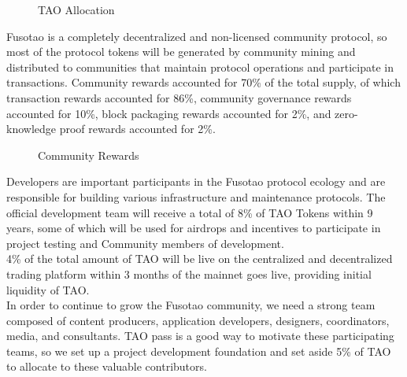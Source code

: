 \documentclass[a4paper,12pt]{article}
\begin{document}
\begin{figure}[htb]        
 \caption{\label{1} TAO Allocation}      
\end{figure}

Fusotao is a completely decentralized and non-licensed community protocol, so most of the protocol tokens will be generated by community mining and distributed to communities that maintain protocol operations and participate in transactions. Community rewards accounted for 70\% of the total supply, of which transaction rewards accounted for 86\%, community governance rewards accounted for 10\%, block packaging rewards accounted for 2\%, and zero-knowledge proof rewards accounted for 2\%.\\
\begin{figure}[htb]        
 \caption{\label{2} Community Rewards}      
\end{figure}
Developers are important participants in the Fusotao protocol ecology and are responsible for building various infrastructure and maintenance protocols. The official development team will receive a total of 8\% of TAO Tokens within 9 years, some of which will be used for airdrops and incentives to participate in project testing and Community members of development.\\
4\% of the total amount of TAO will be live on the centralized and decentralized trading platform within 3 months of the mainnet goes live, providing initial liquidity of TAO.\\
In order to continue to grow the Fusotao community, we need a strong team composed of content producers, application developers, designers, coordinators, media, and consultants. TAO pass is a good way to motivate these participating teams, so we set up a project development foundation and set aside 5\% of TAO to allocate to these valuable contributors.\\
\end{document}
